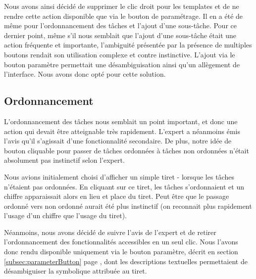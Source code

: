 \documentclass[11pt]{article}
\begin{document}
Nous avons ainsi décidé de supprimer le clic droit pour les templates
et de ne rendre cette action disponible que via le bouton de
paramétrage. Il en a été de même pour l'ordonnancement des tâches et
l'ajout d'une sous-tâche. Pour ce dernier point, même s'il nous
semblait que l'ajout d'une sous-tâche était une action fréquente et
importante, l'ambiguité présentée par la présence de multiples boutons
rendait son utilisation complexe et contre instinctive. L'ajout via le
bouton paramètre permettait une désambiguisation ainsi qu'un
allègement de l'interface. Nous avons donc opté pour cette solution.



\subsection{Ordonnancement}

L'ordonnancement des tâches nous semblait un point important, et donc
une action qui devait être atteignable très rapidement. L'expert a
néanmoins émis l'avis qu'il s'agissait d'une fonctionnalité
secondaire. De plus, notre idée de bouton cliquable pour passer de
tâches ordonnées à tâches non ordonnées n'était absolument pas
instinctif selon l'expert.

Nous avions initialement choisi d'afficher un simple tiret - lorsque
les tâches n'étaient pas ordonnées. En cliquant sur ce tiret, les
tâches s'ordonnaient et un chiffre apparaissait alors en lieu et place
du tiret. Peut être que le passage ordonné vers non ordonné aurait été
plus instinctif (on reconnait plus rapidement l'usage d'un chiffre que
l'usage du tiret).

Néanmoins, nous avons décidé de suivre l'avis de l'expert et de
retirer l'ordonnancement des fonctionnalités accessibles en un seul
clic. Nous l'avons donc rendu disponible uniquement via le bouton
paramètre, décrit en section \ref{subsec:parameterButton} page
\pageref{subsec:parameterButton}, dont les descriptions textuelles
permettaient de désambiguiser la symbolique attribuée au tiret.

\end{document}
